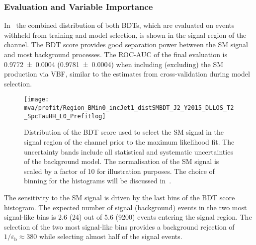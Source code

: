 \subsubsection{Evaluation and Variable Importance}%
\label{sec:bdt_performance}

In~ the combined distribution of both BDTs,
which are evaluated on events withheld from training and model
selection, is shown in the signal region of the \hadhad channel. The
BDT score provides good separation power between the SM \HH signal and
most background processes. The ROC-AUC of the final evaluation is
\num{0.9772 +- 0.0004} (\num{0.9781 +- 0.0004}) when including
(excluding) the SM \HH production via VBF, similar to the estimates
from cross-validation during model selection.

\begin{figure}[htbp]
  \centering

  \texttt{[image: mva/prefit/Region\_BMin0\_incJet1\_distSMBDT\_J2\_Y2015\_DLLOS\_T2\_SpcTauHH\_L0\_Prefitlog]}

  \caption{Distribution of the BDT score used to select the SM \HH
    signal in the signal region of the \hadhad channel prior to the
    maximum likelihood fit. The uncertainty bands include all
    statistical and systematic uncertainties of the background
    model. The normalisation of the SM \HH signal is scaled by a
    factor of 10 for illustration purposes. The choice of binning for
    the histograms will be discussed in~.}
  \label{fig:mva_smbdt_prefit}
\end{figure}

The sensitivity to the SM \HH signal is driven by the last bins of the
BDT score histogram.  The expected number of signal (background)
events in the two most signal-like bins is 2.6 (24) out of 5.6 (9200)
events entering the signal region. The selection of the two most
signal-like bins provides a background rejection of
$1 / \varepsilon_{\text{b}} \approx 380$ while selecting almost half
of the signal events.

